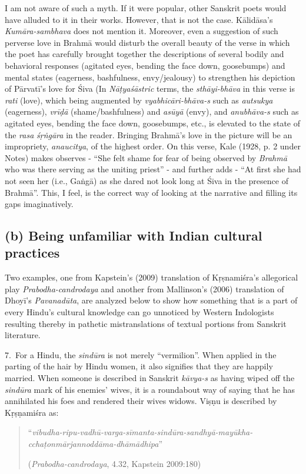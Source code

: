 I am not aware of such a myth. If it were popular, other Sanskrit poets would have alluded to it in their works. However, that is not the case. Kālidāsa’s \textsl{Kumāra-sambhava} does not mention it. Moreover, even a suggestion of such perverse love in Brahmā would disturb the overall beauty of the verse in which the poet has carefully brought together the descriptions of several bodily and behavioral responses (agitated eyes, bending the face down, goosebumps) and mental states (eagerness, bashfulness, envy/jealousy) to strengthen his depiction of Pārvatī’s love for Śiva (In \textsl{Nāṭyaśāstric} terms, the \textsl{sthāyi-bhāva} in this verse is \textsl{rati} (love), which being augmented by \textsl{vyabhicāri-bhāva-s} such as \textsl{autsukya }(eagerness), \textsl{vrīḍā }(shame/bashfulness) and \textsl{asūyā }(envy), and \textsl{anubhāva-s} such as agitated eyes, bending the face down, goosebumps, etc., is elevated to the state of the \textsl{rasa} \textsl{śṛṅgāra} in the reader. Bringing Brahmā’s love in the picture will be an impropriety, \textsl{anaucitya}, of the highest order. On this verse, Kale (1928, p. 2 under Notes) makes observes - “She felt shame for fear of being observed by \textsl{Brahmā} who was there serving as the uniting priest” - and further adds - “At first she had not seen her (i.e., Gaṅgā) as she dared not look long at Śiva in the presence of Brahmā”. This, I feel, is the correct way of looking at the narrative and filling its gaps imaginatively.

\subsection*{(b) Being unfamiliar with Indian cultural practices}

Two examples, one from Kapstein’s (2009) translation of Kṛṣnamiśra’s allegorical play \textsl{Prabodha-candrodaya} and another from Mallinson’s (2006) translation of Dhoyī’s \textsl{Pavanadūta}, are analyzed below to show how something that is a part of every Hindu’s cultural knowledge can go unnoticed by Western Indologists resulting thereby in pathetic mistranslations of textual portions from Sanskrit literature. 

7.~For a Hindu, the \textsl{sindūra} is not merely “vermilion”. When applied in the parting of the hair by Hindu women, it also signifies that they are happily married. When someone is described in Sanskrit \textsl{kāvya-s} as having wiped off the \textsl{sindūra} mark of his enemies’ wives, it is a roundabout way of saying that he has annihilated his foes and rendered their wives widows. Viṣṇu is described by Kṛṣṇamiśra as: 
\begin{quote}
“\textsl{vibudha-ripu-vadhū-varga-sīmanta-sindūra-sandhyā-mayūkha-cchaṭonmārjannoddāma-dhāmādhipa}” 

\hfill(\textsl{Prabodha-candrodaya}, 4.32, Kapstein 2009:180)
\end{quote}

